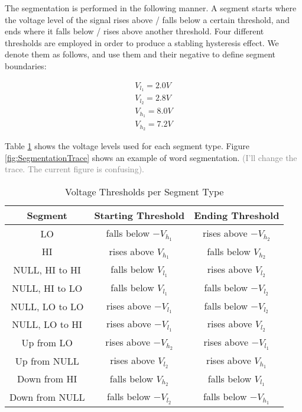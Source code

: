\documentclass[conference]{IEEEtran}
\begin{document}
  The segmentation is performed in the following manner. A segment starts where the voltage level of the signal rises above / falls below a certain threshold, and ends where it falls below / rises above another threshold. Four different thresholds are employed in order to produce a stabling hysteresis effect. We denote them as follows, and use them and their negative to define segment boundaries:
  
  \begin{align*}
    V_{l_1} = 2.0V \\
    V_{l_2} = 2.8V \\
    V_{h_1} = 8.0V \\
    V_{h_2} = 7.2V 
  \end{align*}
  
  Table \ref{tab:SegmentationLevels} shows the voltage levels used for each segment type. Figure \ref{fig:SegmentationTrace} shows an example of word segmentation. \textcolor{gray}{(I'll change the trace. The current figure is confusing).}
  
  \begin{table}
    \caption{Voltage Thresholds per Segment Type}
    \label{tab:SegmentationLevels}
    \centering
    \begin{tabular}{|c c c|} 
      \hline
      Segment & Starting Threshold & Ending Threshold \\ [0.5ex] 
      \hline\hline
      LO & falls below $-V_{h_1}$ & rises above $-V_{h_2}$ \\
      \hline
      HI & rises above $V_{h_1}$ & falls below $V_{h_2}$ \\
      \hline
      NULL, HI to HI & falls below $V_{l_1}$ & rises above $V_{l_2}$ \\
      \hline
      NULL, HI to LO & falls below $V_{l_1}$ & falls below $-V_{l_2}$ \\
      \hline
      NULL, LO to LO & rises above $-V_{l_1}$ & falls below $-V_{l_2}$ \\
      \hline
      NULL, LO to HI & rises above $-V_{l_1}$ & rises above $V_{l_2}$ \\
      \hline
      Up from LO & rises above $-V_{h_2}$ & rises above $-V_{l_1}$ \\
      \hline
      Up from NULL & rises above $V_{l_2}$ & rises above $V_{h_1}$ \\
      \hline
      Down from HI & falls below $V_{h_2}$ & falls below $V_{l_1}$ \\
      \hline
      Down from NULL & falls below $-V_{l_2}$ & falls below $-V_{h_1}$ \\
      \hline
    \end{tabular}
  \end{table}
  
\end{document}
